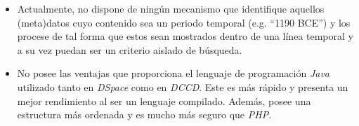 \begin{itemize}
\tightlist
\item
  Actualmente, no dispone de ningún mecanismo que identifique aquellos
  (meta)datos cuyo contenido sea un periodo temporal (e.g. ``1190 BCE'') y
  los procese de tal forma que estos sean mostrados dentro de una línea
  temporal y a su vez puedan ser un criterio aislado de búsqueda.
\item
  No posee las ventajas que proporciona el lenguaje de programación
  \emph{Java} utilizado tanto en \emph{DSpace} como en \emph{DCCD}. Este
  es más rápido y presenta un mejor rendimiento al ser un lenguaje
  compilado. Además, posee una estructura más ordenada y es mucho más
  seguro que \emph{PHP}.
\end{itemize}
